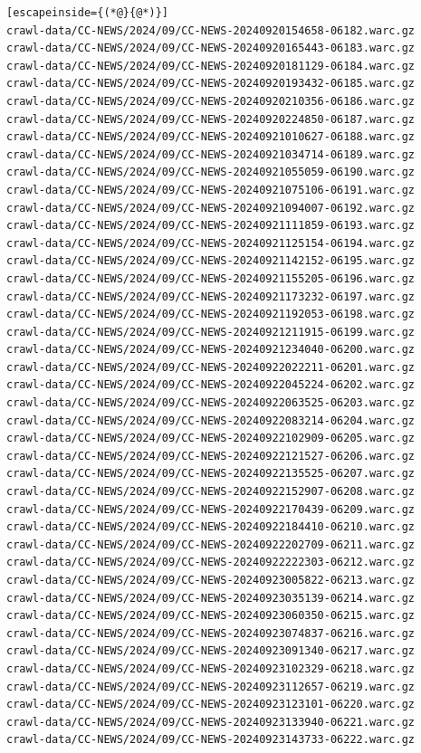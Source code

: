 \begin{lstlisting}[escapeinside={(*@}{@*)}]
crawl-data/CC-NEWS/2024/09/CC-NEWS-20240920154658-06182.warc.gz
crawl-data/CC-NEWS/2024/09/CC-NEWS-20240920165443-06183.warc.gz
crawl-data/CC-NEWS/2024/09/CC-NEWS-20240920181129-06184.warc.gz
crawl-data/CC-NEWS/2024/09/CC-NEWS-20240920193432-06185.warc.gz
crawl-data/CC-NEWS/2024/09/CC-NEWS-20240920210356-06186.warc.gz
crawl-data/CC-NEWS/2024/09/CC-NEWS-20240920224850-06187.warc.gz
crawl-data/CC-NEWS/2024/09/CC-NEWS-20240921010627-06188.warc.gz
crawl-data/CC-NEWS/2024/09/CC-NEWS-20240921034714-06189.warc.gz
crawl-data/CC-NEWS/2024/09/CC-NEWS-20240921055059-06190.warc.gz
crawl-data/CC-NEWS/2024/09/CC-NEWS-20240921075106-06191.warc.gz
crawl-data/CC-NEWS/2024/09/CC-NEWS-20240921094007-06192.warc.gz
crawl-data/CC-NEWS/2024/09/CC-NEWS-20240921111859-06193.warc.gz
crawl-data/CC-NEWS/2024/09/CC-NEWS-20240921125154-06194.warc.gz
crawl-data/CC-NEWS/2024/09/CC-NEWS-20240921142152-06195.warc.gz
crawl-data/CC-NEWS/2024/09/CC-NEWS-20240921155205-06196.warc.gz
crawl-data/CC-NEWS/2024/09/CC-NEWS-20240921173232-06197.warc.gz
crawl-data/CC-NEWS/2024/09/CC-NEWS-20240921192053-06198.warc.gz
crawl-data/CC-NEWS/2024/09/CC-NEWS-20240921211915-06199.warc.gz
crawl-data/CC-NEWS/2024/09/CC-NEWS-20240921234040-06200.warc.gz
crawl-data/CC-NEWS/2024/09/CC-NEWS-20240922022211-06201.warc.gz
crawl-data/CC-NEWS/2024/09/CC-NEWS-20240922045224-06202.warc.gz
crawl-data/CC-NEWS/2024/09/CC-NEWS-20240922063525-06203.warc.gz
crawl-data/CC-NEWS/2024/09/CC-NEWS-20240922083214-06204.warc.gz
crawl-data/CC-NEWS/2024/09/CC-NEWS-20240922102909-06205.warc.gz
crawl-data/CC-NEWS/2024/09/CC-NEWS-20240922121527-06206.warc.gz
crawl-data/CC-NEWS/2024/09/CC-NEWS-20240922135525-06207.warc.gz
crawl-data/CC-NEWS/2024/09/CC-NEWS-20240922152907-06208.warc.gz
crawl-data/CC-NEWS/2024/09/CC-NEWS-20240922170439-06209.warc.gz
crawl-data/CC-NEWS/2024/09/CC-NEWS-20240922184410-06210.warc.gz
crawl-data/CC-NEWS/2024/09/CC-NEWS-20240922202709-06211.warc.gz
crawl-data/CC-NEWS/2024/09/CC-NEWS-20240922222303-06212.warc.gz
crawl-data/CC-NEWS/2024/09/CC-NEWS-20240923005822-06213.warc.gz
crawl-data/CC-NEWS/2024/09/CC-NEWS-20240923035139-06214.warc.gz
crawl-data/CC-NEWS/2024/09/CC-NEWS-20240923060350-06215.warc.gz
crawl-data/CC-NEWS/2024/09/CC-NEWS-20240923074837-06216.warc.gz
crawl-data/CC-NEWS/2024/09/CC-NEWS-20240923091340-06217.warc.gz
crawl-data/CC-NEWS/2024/09/CC-NEWS-20240923102329-06218.warc.gz
crawl-data/CC-NEWS/2024/09/CC-NEWS-20240923112657-06219.warc.gz
crawl-data/CC-NEWS/2024/09/CC-NEWS-20240923123101-06220.warc.gz
crawl-data/CC-NEWS/2024/09/CC-NEWS-20240923133940-06221.warc.gz
crawl-data/CC-NEWS/2024/09/CC-NEWS-20240923143733-06222.warc.gz

\end{lstlisting}
